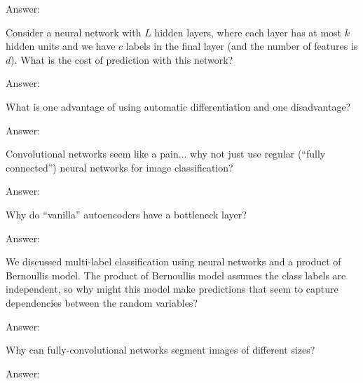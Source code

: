 \documentclass{article}
\newenvironment{answer}{\par\begingroup\color{answer}Answer: }{\endgroup}
\newcommand{\TODO}{\color{red}{TODO}}
\begin{document}
\begin{qlist}
\begin{answer}\TODO\end{answer}


\item Consider a neural network with $L$ hidden layers, where each layer has at most $k$ hidden units and we have $c$ labels in the final layer (and the number of features is $d$). What is the cost of prediction with this network?

\begin{answer}\TODO\end{answer}


\item What is one advantage of using automatic differentiation and one disadvantage?

\begin{answer}\TODO\end{answer}


\item Convolutional networks seem like a pain... why not just use regular (``fully connected'') neural networks for image classification?

\begin{answer}\TODO\end{answer}


\item Why do ``vanilla'' autoencoders have a bottleneck layer?

\begin{answer}\TODO\end{answer}


\item We discussed multi-label classification using neural networks and a product of Bernoullis model. The product of Bernoullis model assumes the class labels are independent, so why might this model make predictions that seem to capture dependencies between the random variables?

\begin{answer}\TODO\end{answer}


\item Why can fully-convolutional networks segment images of different sizes?

\begin{answer}\TODO\end{answer}


\end{qlist}
\end{document}
